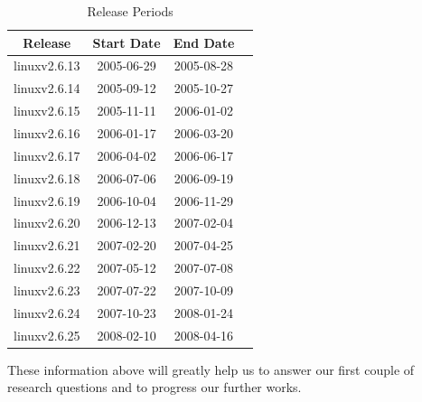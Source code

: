 \documentclass{acm_proc_article-sp}
\begin{document}
\begin{table}[ht]
\caption{Release Periods}  %
\centering 						%
\begin{tabular}{c c c c}				%
\hline\hline						%
Release 			& Start Date		& End Date \\ [0.5ex]
\hline 							%
linuxv2.6.13		& 2005-06-29	& 2005-08-28 \\
linuxv2.6.14		& 2005-09-12	& 2005-10-27 \\
linuxv2.6.15		& 2005-11-11	& 2006-01-02 \\
linuxv2.6.16		& 2006-01-17	& 2006-03-20 \\
linuxv2.6.17		& 2006-04-02	& 2006-06-17 \\
linuxv2.6.18		& 2006-07-06	& 2006-09-19 \\
linuxv2.6.19		& 2006-10-04	& 2006-11-29 \\
linuxv2.6.20  		& 2006-12-13	& 2007-02-04 \\
linuxv2.6.21		& 2007-02-20	& 2007-04-25 \\
linuxv2.6.22		& 2007-05-12	& 2007-07-08 \\
linuxv2.6.23		& 2007-07-22	& 2007-10-09 \\
linuxv2.6.24		& 2007-10-23	& 2008-01-24 \\
linuxv2.6.25		& 2008-02-10	& 2008-04-16 \\
[1ex]							%
\hline 							%
\end{tabular}
\label{table:nonlin} 				%
\end{table}

These information above will greatly help us to answer our first couple of research questions and to progress our further works.
\end{document}
